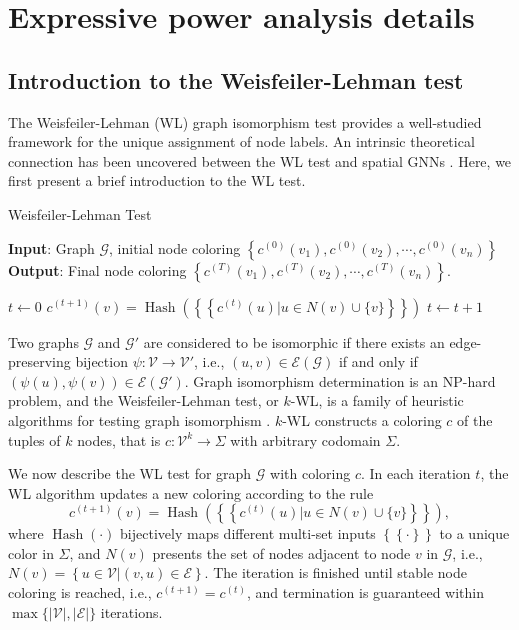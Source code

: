 \documentclass[letterpaper]{article} \usepackage{aaai24}
\newcommand \multiset[1] {\left\{\!\!\left\{#1\right\}\!\!\right\} }
\theoremstyle{plain}
\theoremstyle{definition}
\theoremstyle{remark}
\begin{document}
\section{Expressive power analysis details}
\label{appendix: expressive_power_analysis}


\subsection{Introduction to the Weisfeiler-Lehman test}
\label{appendix: WL}



The Weisfeiler-Lehman (WL) graph isomorphism test \cite{WLtest} provides a well-studied framework for the unique assignment of node labels. An intrinsic theoretical connection has been uncovered between the WL test and spatial GNNs \cite{GIN2019, kWL2019}. Here, we first present a brief introduction to the WL test.

\begin{algorithm}[ht] 
\caption{Weisfeiler-Lehman Test}
\label{alg:WL-test}
\textbf{Input}: Graph $\mathcal{G}$, initial node coloring $\left\{c^{(0)}(v_1), c^{(0)}(v_2), \cdots, c^{(0)}(v_n)\right\}$ \\
\textbf{Output}: Final node coloring $\left\{c^{(T)}(v_1), c^{(T)}(v_2), \cdots, c^{(T)}(v_n)\right\}$.
\begin{algorithmic}[1] \STATE $t \leftarrow 0$ 
\REPEAT
    \STATE $c^{(t+1)}(v) = \operatorname{Hash}\left(\multiset{c^{(t)}(u)|u \in N(v)\cup \{v\} }\right)$ \ENDFOR
    \STATE $t \leftarrow t+1$
\end{algorithmic}
\end{algorithm}

Two graphs $\mathcal{G}$ and $\mathcal{G}'$ are considered to be isomorphic if there exists an edge-preserving bijection $\psi: \mathcal{V} \to \mathcal{V}'$, i.e., $(u,v)\in \mathcal{E}(\mathcal{G})$ if and only if $\left(\psi(u), \psi(v)\right)\in\mathcal{E}(\mathcal{G}')$. 
Graph isomorphism determination is an NP-hard problem, and the Weisfeiler-Lehman test, or $k$-WL, is a family of heuristic algorithms for testing graph isomorphism \cite{kWL2019}. $k$-WL constructs a coloring $c$ of the tuples of $k$ nodes, that is $c: \mathcal{V}^k \to \Sigma$ with arbitrary codomain $\Sigma$.

We now describe the WL test for graph $\mathcal{G}$ with coloring $c$.  In each iteration $t$, the WL algorithm updates a new coloring according to the rule
\begin{equation}
    c^{(t+1)}(v) = \operatorname{Hash}\left( \multiset{c^{(t)}(u)| u \in N(v)\cup \{v\} } \right),
\end{equation}
where $\operatorname{Hash}(\cdot)$ bijectively maps different multi-set inputs $\multiset{\cdot}$ to a unique color in $\Sigma$, and $N(v)$ presents the set of nodes adjacent to node $v$ in $\mathcal{G}$, i.e., $N(v)=\left\{u \in \mathcal{V} | (v,u)\in \mathcal{E}\right\}$. The iteration is finished until stable node coloring is reached, i.e., $c^{(t+1)}=c^{(t)}$, and termination is guaranteed within $\max \{|\mathcal{V}|, |\mathcal{E}|\}$ iterations.
\end{document}
